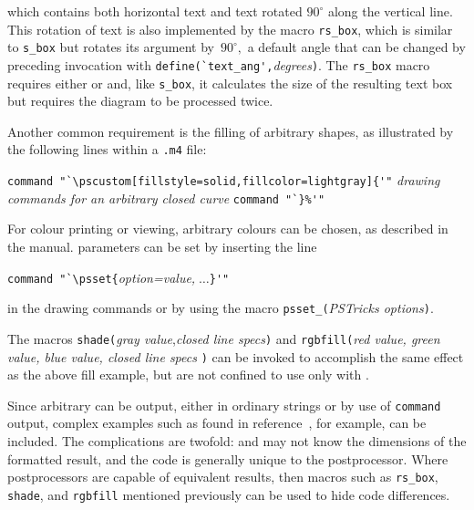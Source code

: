 {\small }

\noindent%
which contains both horizontal text and text rotated $90^\circ$ along the
vertical line.
This rotation of text is also implemented by the macro
{\tt rs\_box}, which is similar
to {\tt s\_box} but rotates its argument by~$90^\circ,$ a default angle
that can be changed by preceding invocation with
\verb|define(`text_ang',|{\sl degrees}{\tt )}.  The {\tt rs\_box} macro
requires either \PSTricks or \TPGF and, like {\tt s\_box}, it calculates the
size of the resulting text box but requires the diagram to be
processed twice.

Another common requirement is the filling of arbitrary shapes, as
illustrated by the following lines within a {\tt .m4} file:

\vspace{\parsep}
\noindent%
\verb|command "`\pscustom[fillstyle=solid,fillcolor=lightgray]{'"|
\hfill\break
{\sl drawing commands for an arbitrary closed curve}
\hfill\break
\verb|command "`}%'"|
\vspace{\parsep}

For colour printing or viewing, arbitrary
colours can be chosen, as described in the \PSTricks manual.
\PSTricks parameters can be set by inserting the line

\vspace{\parsep}
\noindent\verb|command "`\psset{|{\sl option=value,}$\;\ldots$\verb|}'"|
\vspace{\parsep}

\noindent%
in the drawing commands or by using the macro
{\tt psset\_(}{\sl PSTricks options}{\tt )}.

The macros
 {\tt shade(}{\sl gray value},{\sl closed line specs}{\tt )}
and
 {\tt rgbfill(}{\sl red value, green value, blue value, closed line specs}%
 {\tt )}
can be invoked to accomplish the same effect as the above fill example, but
are not confined to use only with \PSTricks.

Since arbitrary \latex can be output, either in ordinary strings or by
use of {\tt command} output, complex examples such as found in
reference~\cite{Girou94},
for example, can be included.  The complications
are twofold: \latex and \dpic may not know the dimensions of the formatted
result, and the code is generally unique to the postprocessor.
Where postprocessors are capable of equivalent results, then
macros such as {\tt rs\_box}, {\tt shade}, and {\tt rgbfill} mentioned
previously can be used to hide code differences.

